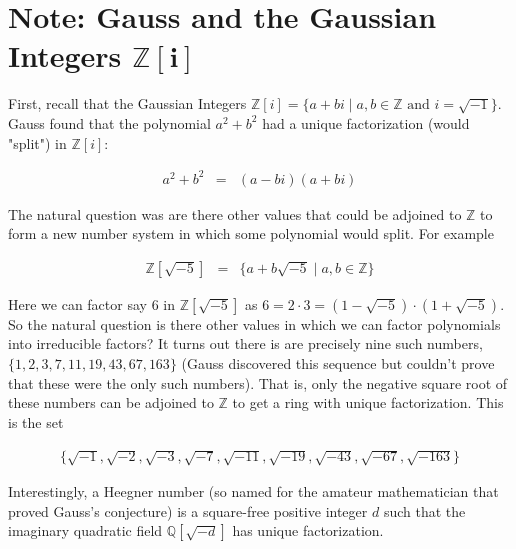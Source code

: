 \documentclass[11pt, oneside]{article}   	%
\theoremstyle{definition}
\begin{document}


\section{Note: Gauss and the Gaussian Integers $\boldsymbol{\mathbb{Z}[i]}$}
First, recall that the Gaussian Integers $\mathbb{Z}[i] = \{a +
bi \mid a,b \in \mathbb{Z} \text{ and } i = \sqrt{-1} \}$.  Gauss
found that the polynomial $a^2 + b^2$ had a unique factorization
(would "split") in $\mathbb{Z}[i]$:


\begin{equation*}
\begin{array}{rlll} 
a^2 + b^2 
&=&  (a - bi)(a + bi)
\end{array}
\end{equation*}

\bigskip
\noindent
The natural question was are there other values that could be
adjoined to $\mathbb{Z}$ to form a new number system in which
some polynomial would split. For example

\begin{equation*}
\begin{array}{rlll} 
\mathbb{Z}[\sqrt{-5}]
&=& \{a+b\sqrt{-5}  \mid a,b \in \mathbb{Z}\}
\end{array}
\end{equation*}

\bigskip
\noindent 
Here we can factor say $6$ in $\mathbb{Z}[\sqrt{-5}]$ as $6 = 2
\cdot 3 = (1 - \sqrt{-5}) \cdot (1 + \sqrt{-5})$. So the natural
question is there other values in which we can factor polynomials
into irreducible factors? It turns out there is are precisely
nine such numbers, $\{1,2,3,7,11,19,43,67,163\}$ (Gauss
discovered this sequence but couldn't prove that these were the
only such numbers). That is, only the negative square root of
these numbers can be adjoined to $\mathbb{Z}$ to get a ring with
unique factorization. This is the set

\begin{equation*}
\begin{array}{rlll} 
\{\sqrt{-1}, \sqrt{-2}, \sqrt{-3},  \sqrt{-7}, \sqrt{-11}, \sqrt{-19}, \sqrt{-43}, \sqrt{-67}, \sqrt{-163}\}
\end{array}
\end{equation*}

\bigskip
\noindent
Interestingly, a Heegner number (so named for the amateur
mathematician that proved Gauss's conjecture) is a square-free
positive integer $d$ such that the imaginary quadratic field
$\mathbb {Q} [\sqrt {-d}]$ has unique factorization.
\end{document}
